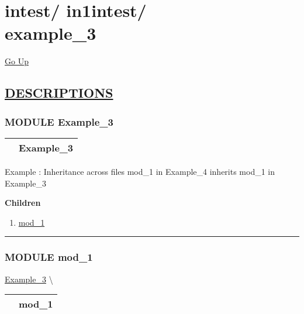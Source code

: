 \chapter*{\color{headfile}
{\large intest\slash\hspace{0pt}}
{\large in1intest\slash\hspace{0pt}}
 \\
example_3
}
\hypertarget{ecldoc:toc:intest.in1intest.example_3}{}
\hyperlink{ecldoc:toc:root/intest/in1intest}{Go Up}


\section*{\underline{\textsf{DESCRIPTIONS}}}
\subsection*{\textsf{\colorbox{headtoc}{\color{white} MODULE}
Example\_3}}

\hypertarget{ecldoc:intest.in1intest.Example_3}{}

{\renewcommand{\arraystretch}{1.5}
\begin{tabularx}{\textwidth}{|>{\raggedright\arraybackslash}l|X|}
\hline
\hspace{0pt}\mytexttt{\color{red} } & \textbf{Example\_3} \\
\hline
\end{tabularx}
}

\par
Example : Inheritance across files mod\_1 in Example\_4 inherits mod\_1 in Example\_3


\textbf{Children}
\begin{enumerate}
\item \hyperlink{ecldoc:intest.in1intest.Example_3.mod_1}{mod\_1}
\end{enumerate}

\rule{\linewidth}{0.5pt}

\subsection*{\textsf{\colorbox{headtoc}{\color{white} MODULE}
mod\_1}}

\hypertarget{ecldoc:intest.in1intest.Example_3.mod_1}{}
\hspace{0pt} \hyperlink{ecldoc:intest.in1intest.Example_3}{Example_3} \textbackslash 

{\renewcommand{\arraystretch}{1.5}
\begin{tabularx}{\textwidth}{|>{\raggedright\arraybackslash}l|X|}
\hline
\hspace{0pt}\mytexttt{\color{red} } & \textbf{mod\_1} \\
\hline
\end{tabularx}
}

